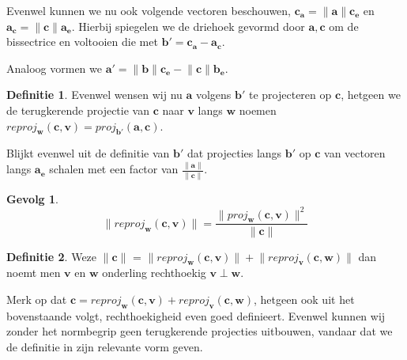 \documentclass{amsart}
\theoremstyle{definition}
\newtheorem{dfn}{Definitie}[section]
\newtheorem{csq}{Gevolg}[section]
\newcommand{\norm}[1]{\lVert{#1}\rVert}
\newcommand{\vvec}[1][v]{\mathbf{#1}}
\newcommand{\uvec}[1][v]{\vvec[#1]_\mathbf{e}}
\newcommand{\vnorm}[1]{\norm{\vvec[#1]}}
\begin{document}
Evenwel kunnen we nu ook volgende vectoren beschouwen, $\vvec[c_a] = \vnorm a \uvec[c]$ en $\vvec[a_c] = \vnorm c \uvec[a]$.
Hierbij spiegelen we de driehoek gevormd door $\vvec[a], \vvec[c]$ om de bissectrice en voltooien die met $\vvec[b'] = \vvec[c_a] - \vvec[a_c]$.

Analoog vormen we $\vvec[a'] = \vnorm b\uvec[c] - \vnorm c\uvec[b]$.

\begin{dfn}
	Evenwel wensen wij nu $\vvec[a]$ volgens $\vvec[b']$ te projecteren op $\vvec[c]$, hetgeen we de terugkerende projectie van $\vvec[c]$ naar $\vvec$ langs $\vvec[w]$ noemen $reproj_{\vvec[w]}(\vvec[c], \vvec) = proj_{\vvec[b']}(\vvec[a], \vvec[c])$.
\end{dfn}

Blijkt evenwel uit de definitie van $\vvec[b']$ dat projecties langs $\vvec[b']$ op $\vvec[c]$ van vectoren langs $\uvec[a]$ schalen met een factor van $\frac{\vnorm a}{\vnorm c}$.

\begin{csq}
	\begin{equation*}
		\norm{reproj_{\vvec[w]}(\vvec[c], \vvec)} = \frac{\norm{proj_{\vvec[w]}(\vvec[c], \vvec)}^2}{\vnorm c}
	\end{equation*}
\end{csq}

\begin{dfn}
	Weze $\vnorm c$ = $\norm{reproj_{\vvec[w]}(\vvec[c], \vvec)} + \norm{reproj_{\vvec}(\vvec[c], \vvec[w])}$ dan noemt men $\vvec$ en $\vvec[w]$ onderling rechthoekig $\vvec \perp \vvec[w]$.
\end{dfn}

Merk op dat $\vvec[c] = reproj_{\vvec[w]}(\vvec[c], \vvec) + reproj_{\vvec}(\vvec[c], \vvec[w])$, hetgeen ook uit het bovenstaande volgt, rechthoekigheid even goed definieert.
Evenwel kunnen wij zonder het normbegrip geen terugkerende projecties uitbouwen, vandaar dat we de definitie in zijn relevante vorm geven.
\end{document}
